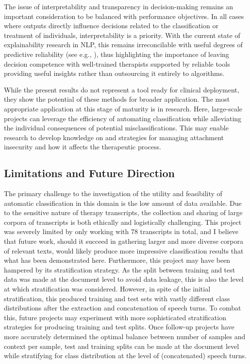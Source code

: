 \documentclass[12pt]{report}
\begin{document}
The issue of interpretability and transparency in decision-making remains an important consideration to be balanced with performance objectives.
In all cases where outputs directly influence decisions related to the classification or treatment of individuals, interpretability is a priority.
With the current state of explainability research in NLP, this remains irreconcilable with useful degrees of predictive reliability (see e.g., ), thus highlighting the importance of leaving decision competence with well-trained therapists supported by reliable tools providing useful insights rather than outsourcing it entirely to algorithms.

While the present results do not represent a tool ready for clinical deployment, they show the potential of these methods for broader application.
The most appropriate application at this stage of maturity is in research.
Here, large-scale projects can leverage the efficiency of automating classification while alleviating the individual consequences of potential misclassifications.
This may enable research to develop knowledge on and strategies for managing attachment insecurity and how it affects the therapeutic process.

\subsection{Limitations and Future Direction}
The primary challenge to the investigation of the utility and feasibility of automatic classification in this domain is the low amount of data available.
Due to the sensitive nature of therapy transcripts, the collection and sharing of large corpora of transcripts is both ethically and logistically challenging.
This project was severely limited by only working with 78 transcripts in total, and I believe that future work, should it succeed in gathering larger and more diverse corpora of relevant texts, would likely produce more impressive classification results that what has been demonstrated here.
Furthermore, this project may have been hampered by its stratification strategy.
As the split between training and test data was made at the document level to avoid data leakage, this is also the level at which stratification was considered.
However, in spite of the initial stratification, this produced training and test sets with vastly different class distributions after the extraction and concatenation of speech turns.
To combat this, future projects may experiment with more sophisticated stratification strategies for producing training and test splits.
Once follow-up projects have more accurately determined the optimal balance between number of samples and context per sample, test and training splits can be made at the document level while stratifying for class distribution at the level of (concatenated) speech turns.
\end{document}
